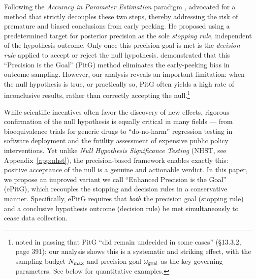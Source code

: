 Following the \textit{Accuracy in Parameter Estimation} paradigm \citep{maxwell2008},
\cite{kruschke2015doing} advocated for a method that strictly decouples these two steps,
thereby addressing the risk of premature and biased conclusions from early peeking.
He proposed using a predetermined target for posterior precision as the
sole \textit{stopping rule}, independent of the hypothesis outcome. Only once this precision goal
is met is the \textit{decision rule} applied to accept or reject the null hypothesis.
\cite{kruschke2015doing} demonstrated that this ``Precision is the Goal'' (PitG) method
eliminates the early-peeking bias in outcome sampling. However, our analysis reveals an important
limitation: when the null hypothesis is true, or practically so, PitG often yields a high rate of inconclusive
results, rather than correctly accepting the null.\footnote{\citealt{kruschke2015doing} noted in passing that PitG ``did remain undecided
in some cases'' (\S13.3.2, page 391); our analysis shows this is a systematic and
striking effect, with the sampling budget $N_{\rm max}$ and precision goal $\omega_{\rm goal}$
as the key governing parameters. See below for quantitative examples.}

While scientific incentives often favor the discovery of new effects,
rigorous confirmation of the null hypothesis is equally critical in many fields ---
from bioequivalence trials for generic drugs \citep{karalis2012} to ``do-no-harm''
regression testing in software deployment and the futility assessment of expensive
public policy interventions.
Yet unlike \textit{Null Hypothesis Significance Testing} (NHST, see Appendix~\ref{app:nhst}),
the precision-based framework enables exactly this: positive acceptance of the null
is a genuine and actionable verdict.
In this paper, we propose an improved variant we call
``Enhanced Precision is the Goal'' (ePitG), which recouples the stopping and decision
rules in a conservative manner.
Specifically, ePitG requires that \textit{both} the precision goal (stopping rule) and a
conclusive hypothesis outcome (decision rule) be met simultaneously to cease data collection.

